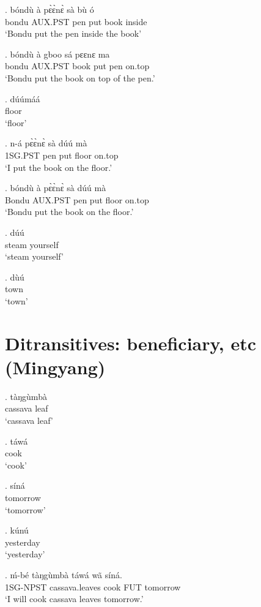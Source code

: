 \documentclass{assets/fieldnotes}
\begin{document}
\exg. bóndù à pɛ̀ɛ̀nɛ̀ sà bù ó \\
bondu AUX.PST pen put book inside \\
`Bondu put the pen inside the book'

\exg. bóndù à gboo sá pɛɛnɛ ma \\
bondu AUX.PST book put pen on.top \\
`Bondu put the book on top of the pen.'

\exg. dúúmáá \\
floor\\
`floor'

\exg. n-á pɛ̀ɛ̀nɛ̀ sà dúú mà \\
1SG.PST pen put floor on.top \\
`I put the book on the floor.'

\exg. bóndù à pɛ̀ɛ̀nɛ̀ sà dúú mà \\
Bondu AUX.PST pen put floor on.top \\
`Bondu put the book on the floor.'

\exg. dúú \\
steam yourself\\
`steam yourself'

\exg. dùú \\
town\\
`town'



\section{Ditransitives: beneficiary, etc (Mingyang)} \label{Ditransitives: beneficiary, etc (Mingyang)} %
\exg. tàŋgùmbà\\
cassava leaf\\
    `cassava leaf'

\exg. táwá\\
cook\\
    `cook'

\exg. síná\\
tomorrow\\
    `tomorrow'

\exg. kúnú\\
yesterday\\
    `yesterday'

\exg. ḿ-bé tàŋgùmbà táwá wã síná.\\
    1SG-NPST cassava.leaves cook FUT tomorrow\\
    `I will cook cassava leaves tomorrow.'
\end{document}

